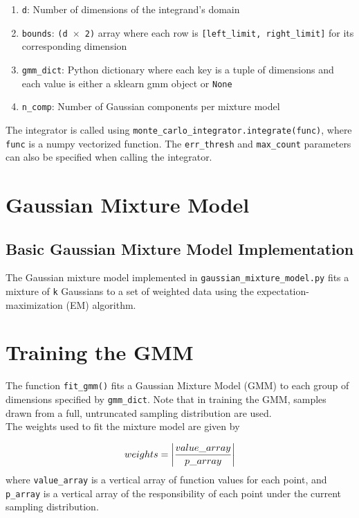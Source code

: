 \documentclass{article}
\begin{document}
\begin{enumerate}

\item \texttt{d}: Number of dimensions of the integrand's domain

\item \texttt{bounds}: \texttt{(d $\times$ 2)} array where each row is
\texttt{[left\_limit, right\_limit]} for its corresponding dimension

\item \texttt{gmm\_dict}: Python dictionary where each key is a tuple of
dimensions and each value is either a sklearn gmm object or \texttt{None}

\item \texttt{n\_comp}: Number of Gaussian components per mixture model

\end{enumerate}
The integrator is called using \texttt{monte\_carlo\_integrator.integrate(func)},
where \texttt{func} is a numpy vectorized function. The \texttt{err\_thresh} and
\texttt{max\_count} parameters can also be specified when calling the integrator.

\section{Gaussian Mixture Model}

\subsection{Basic Gaussian Mixture Model Implementation}

The Gaussian mixture model implemented in \texttt{gaussian\_mixture\_model.py}
fits a mixture of \texttt{k} Gaussians to a set of weighted data using the
expectation-maximization (EM) algorithm.

\section{Training the GMM}

The function \texttt{fit\_gmm()}
fits a Gaussian Mixture Model (GMM) to each group of dimensions specified by
\texttt{gmm\_dict}. Note that in training the GMM, samples drawn from a full,
untruncated sampling distribution are used.\\

The weights used to fit the mixture model are given by

\begin{equation}
    weights = \left|value\_array \over p\_array\right|
\end{equation}
where \texttt{value\_array} is a vertical array of function values for each
point, and \texttt{p\_array} is a vertical array of the responsibility of each
point under the current sampling distribution. \\
\end{document}
